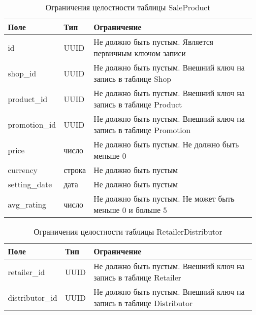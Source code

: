 \begin{table}[!h]
	\begin{center}
		\begin{threeparttable}
			\caption{Ограничения целостности таблицы SaleProduct}
			\label{tbl:entity_sale_product}
			\begin{tabular}{|p{4.5cm}|p{2.5cm}|p{8.5cm}|}
				\hline 
				\textbf{Поле} & \textbf{Тип} & \textbf{Ограничение}  \\
				\hline
				id & UUID & Не должно быть пустым. Является первичным ключом записи  \\
				\hline
				shop\_id & UUID & Не должно быть пустым. Внешний ключ на запись в таблице Shop  \\
				\hline
				product\_id & UUID & Не должно быть пустым. Внешний ключ на запись в таблице Product \\
				\hline
				promotion\_id & UUID & Не должно быть пустым. Внешний ключ на запись в таблице Promotion \\
				\hline
				price & число & Не должно быть пустым. Не должно быть меньше 0  \\
				\hline
				currency & строка & Не должно быть пустым  \\
				\hline
				setting\_date & дата & Не должно быть пустым  \\
				\hline
				avg\_rating & число & Не должно быть пустым. Не может быть меньше 0 и больше 5 \\
				\hline
			\end{tabular}
		\end{threeparttable}			
	\end{center}
\end{table}

\begin{table}[!h]
	\begin{center}
		\begin{threeparttable}
			\caption{Ограничения целостности таблицы RetailerDistributor}
			\label{tbl:entity_retailer_distributor}
			\begin{tabular}{|p{4.5cm}|p{2.5cm}|p{8.5cm}|}
				\hline 
				\textbf{Поле} & \textbf{Тип} & \textbf{Ограничение}  \\
				\hline
				retailer\_id & UUID & Не должно быть пустым. Внешний ключ на запись в таблице Retailer  \\
				\hline
				distributor\_id & UUID & Не должно быть пустым. Внешний ключ на запись в таблице Distributor \\
				\hline
			\end{tabular}
		\end{threeparttable}			
	\end{center}
\end{table}

